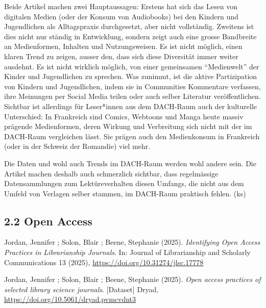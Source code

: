 \documentclass[a4paper,
fontsize=11pt,
oneside,
numbers=noperiodatend,
parskip=half-,
bibliography=totoc,
final
]{scrartcl}
\begin{document}
Beide Artikel machen zwei Hauptaussagen: Erstens hat sich das Lesen von
digitalen Medien (oder der Konsum von Audiobooks) bei den Kindern und
Jugendlichen als Alltagspraxis durchgesetzt, aber nicht vollständig.
Zweitens ist dies nicht nur ständig in Entwicklung, sondern zeigt auch
eine grosse Bandbreite an Medienformen, Inhalten und Nutzungsweisen. Es
ist nicht möglich, einen klaren Trend zu zeigen, ausser den, dass sich
diese Diversität immer weiter ausdehnt. Es ist nicht wirklich möglich,
von einer gemeinsamen \enquote{Medienwelt} der Kinder und Jugendlichen
zu sprechen. Was zunimmt, ist die aktive Partizipation von Kindern und
Jugendlichen, indem sie in Communities Kommentare verfassen, ihre
Meinungen per Social Media teilen oder auch selber Literatur
veröffentlichen. Sichtbar ist allerdings für Leser*innen aus dem
DACH-Raum auch der kulturelle Unterschied: In Frankreich sind Comics,
Webtoons und Manga heute massiv prägende Medienformen, deren Wirkung und
Verbreitung sich nicht mit der im DACH-Raum vergleichen lässt. Sie
prägen auch den Medienkonsum in Frankreich (oder in der Schweiz der
Romandie) viel mehr.

Die Daten und wohl auch Trends im DACH-Raum werden wohl andere sein. Die
Artikel machen deshalb auch schmerzlich sichtbar, dass regelmässige
Datensammlungen zum Lektüreverhalten diesen Umfangs, die nicht aus dem
Umfeld von Verlagen selber stammen, im DACH-Raum praktisch fehlen. (ks)

\subsection{2.2 Open Access}\label{open-access}

Jordan, Jennifer ; Solon, Blair ; Beene, Stephanie (2025).
\emph{Identifying Open Access Practices in Librarianship Journals}. In:
Journal of Librarianship and Scholarly Communications 13 (2025),
\url{https://doi.org/10.31274/jlsc.17778}

Jordan, Jennifer ; Solon, Blair ; Beene, Stephanie (2025). \emph{Open
access practices of selected library science journals}. {[}Dataset{]}
Dryad, \url{https://doi.org/10.5061/dryad.pvmcvdnt3}
\end{document}
